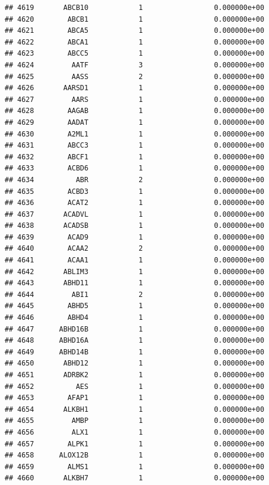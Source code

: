 \documentclass[
]{article}
\begin{document}
\begin{verbatim}
## 4619       ABCB10            1                 0.000000e+00
## 4620        ABCB1            1                 0.000000e+00
## 4621        ABCA5            1                 0.000000e+00
## 4622        ABCA1            1                 0.000000e+00
## 4623        ABCC5            1                 0.000000e+00
## 4624         AATF            3                 0.000000e+00
## 4625         AASS            2                 0.000000e+00
## 4626       AARSD1            1                 0.000000e+00
## 4627         AARS            1                 0.000000e+00
## 4628        AAGAB            1                 0.000000e+00
## 4629        AADAT            1                 0.000000e+00
## 4630        A2ML1            1                 0.000000e+00
## 4631        ABCC3            1                 0.000000e+00
## 4632        ABCF1            1                 0.000000e+00
## 4633        ACBD6            1                 0.000000e+00
## 4634          ABR            2                 0.000000e+00
## 4635        ACBD3            1                 0.000000e+00
## 4636        ACAT2            1                 0.000000e+00
## 4637       ACADVL            1                 0.000000e+00
## 4638       ACADSB            1                 0.000000e+00
## 4639        ACAD9            1                 0.000000e+00
## 4640        ACAA2            2                 0.000000e+00
## 4641        ACAA1            1                 0.000000e+00
## 4642       ABLIM3            1                 0.000000e+00
## 4643       ABHD11            1                 0.000000e+00
## 4644         ABI1            2                 0.000000e+00
## 4645        ABHD5            1                 0.000000e+00
## 4646        ABHD4            1                 0.000000e+00
## 4647      ABHD16B            1                 0.000000e+00
## 4648      ABHD16A            1                 0.000000e+00
## 4649      ABHD14B            1                 0.000000e+00
## 4650       ABHD12            1                 0.000000e+00
## 4651       ADRBK2            1                 0.000000e+00
## 4652          AES            1                 0.000000e+00
## 4653        AFAP1            1                 0.000000e+00
## 4654       ALKBH1            1                 0.000000e+00
## 4655         AMBP            1                 0.000000e+00
## 4656         ALX1            1                 0.000000e+00
## 4657        ALPK1            1                 0.000000e+00
## 4658      ALOX12B            1                 0.000000e+00
## 4659        ALMS1            1                 0.000000e+00
## 4660       ALKBH7            1                 0.000000e+00

\end{verbatim}
\end{document}
